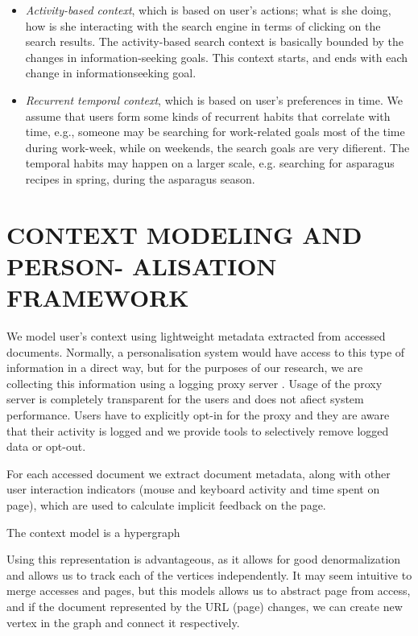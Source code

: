 \documentclass{sig-alternate} %
\begin{document}
\begin{itemize} 
\item \textit{Activity-based context}, which is based on user's actions;
what is she doing, how is she interacting with the
search engine in terms of clicking on the search results.
The activity-based search context is basically bounded
by the changes in information-seeking goals. This context starts, and 
ends with each change in informationseeking goal.
\item \textit{Recurrent temporal context}, which is based on user's
preferences in time. We assume that users form some
kinds of recurrent habits that correlate with time, e.g.,
someone may be searching for work-related goals most
of the time during work-week, while on weekends, the
search goals are very difierent. The temporal habits
may happen on a larger scale, e.g. searching for 
asparagus recipes in spring, during the asparagus season.
\end{itemize}



\section{CONTEXT MODELING AND PERSON- ALISATION FRAMEWORK}
We model user's context using lightweight metadata extracted from 
accessed documents. Normally, a personalisation system would have
 access to this type of information
in a direct way, but for the purposes of our research, we are
collecting this information using a logging proxy server \cite{barla}.
Usage of the proxy server is completely transparent for the
users and does not afiect system performance. Users have to
explicitly opt-in for the proxy and they are aware that their
activity is logged and we provide tools to selectively remove
logged data or opt-out.


For each accessed document we extract document metadata, 
along with other user interaction indicators (mouse
and keyboard activity and time spent on page), which are
used to calculate implicit feedback on the page.


The context model is a hypergraph 



Using this representation is advantageous, as
it allows for good denormalization and allows us to track
each of the vertices independently. It may seem intuitive
to merge accesses and pages, but this models allows us to
abstract page from access, and if the document represented
by the URL (page) changes, we can create new vertex in the
graph and connect it respectively.
\end{document}
